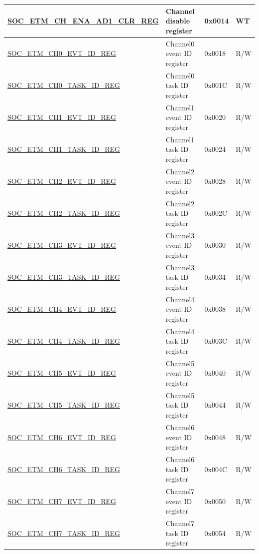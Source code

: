 \begin{longtable}{ | p{6cm} | p{6.2cm} | p{1.3cm} | p{2cm} | }
\hyperref[regdesc:SOCETMCHENAAD1CLRREG]{SOC\_ETM\_CH\_ENA\_AD1\_CLR\_REG} & Channel disable register & 0x0014 & WT \\ \hline
\hyperref[regdesc:SOCETMCHNEVTIDREG]{SOC\_ETM\_CH0\_EVT\_ID\_REG} & Channel0 event ID register & 0x0018 & R/W \\ \hline
\hyperref[regdesc:SOCETMCHNTASKIDREG]{SOC\_ETM\_CH0\_TASK\_ID\_REG} & Channel0 task ID register & 0x001C & R/W \\ \hline
\hyperref[regdesc:SOCETMCHNEVTIDREG]{SOC\_ETM\_CH1\_EVT\_ID\_REG} & Channel1 event ID register & 0x0020 & R/W \\ \hline
\hyperref[regdesc:SOCETMCHNTASKIDREG]{SOC\_ETM\_CH1\_TASK\_ID\_REG} & Channel1 task ID register & 0x0024 & R/W \\ \hline
\hyperref[regdesc:SOCETMCHNEVTIDREG]{SOC\_ETM\_CH2\_EVT\_ID\_REG} & Channel2 event ID register & 0x0028 & R/W \\ \hline
\hyperref[regdesc:SOCETMCHNTASKIDREG]{SOC\_ETM\_CH2\_TASK\_ID\_REG} & Channel2 task ID register & 0x002C & R/W \\ \hline
\hyperref[regdesc:SOCETMCHNEVTIDREG]{SOC\_ETM\_CH3\_EVT\_ID\_REG} & Channel3 event ID register & 0x0030 & R/W \\ \hline
\hyperref[regdesc:SOCETMCHNTASKIDREG]{SOC\_ETM\_CH3\_TASK\_ID\_REG} & Channel3 task ID register & 0x0034 & R/W \\ \hline
\hyperref[regdesc:SOCETMCHNEVTIDREG]{SOC\_ETM\_CH4\_EVT\_ID\_REG} & Channel4 event ID register & 0x0038 & R/W \\ \hline
\hyperref[regdesc:SOCETMCHNTASKIDREG]{SOC\_ETM\_CH4\_TASK\_ID\_REG} & Channel4 task ID register & 0x003C & R/W \\ \hline
\hyperref[regdesc:SOCETMCHNEVTIDREG]{SOC\_ETM\_CH5\_EVT\_ID\_REG} & Channel5 event ID register & 0x0040 & R/W \\ \hline
\hyperref[regdesc:SOCETMCHNTASKIDREG]{SOC\_ETM\_CH5\_TASK\_ID\_REG} & Channel5 task ID register & 0x0044 & R/W \\ \hline
\hyperref[regdesc:SOCETMCHNEVTIDREG]{SOC\_ETM\_CH6\_EVT\_ID\_REG} & Channel6 event ID register & 0x0048 & R/W \\ \hline
\hyperref[regdesc:SOCETMCHNTASKIDREG]{SOC\_ETM\_CH6\_TASK\_ID\_REG} & Channel6 task ID register & 0x004C & R/W \\ \hline
\hyperref[regdesc:SOCETMCHNEVTIDREG]{SOC\_ETM\_CH7\_EVT\_ID\_REG} & Channel7 event ID register & 0x0050 & R/W \\ \hline
\hyperref[regdesc:SOCETMCHNTASKIDREG]{SOC\_ETM\_CH7\_TASK\_ID\_REG} & Channel7 task ID register & 0x0054 & R/W \\ \hline

\end{longtable}
